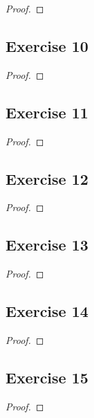 \documentclass[14pt]{extarticle}
\begin{document}
\begin{proof}

\end{proof}

\subsection{Exercise 10}

\begin{proof}

\end{proof}

\subsection{Exercise 11}

\begin{proof}

\end{proof}

\subsection{Exercise 12}

\begin{proof}

\end{proof}

\subsection{Exercise 13}

\begin{proof}

\end{proof}

\subsection{Exercise 14}

\begin{proof}

\end{proof}

\subsection{Exercise 15}

\begin{proof}

\end{proof}
\end{document}
